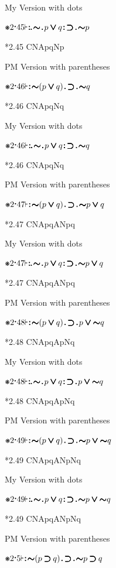 \documentclass[12pt]{article}
\newcommand{\pmthm}{\mathpunct{\text{\scalebox{.5}[1]{$\boldsymbol\vdash$}}}} %
\newcommand{\pmast}{\text{\resizebox{!}{.75\height}{\ding{107}}}} %
\newcommand{\pmcdot}{\text{\raisebox{.05cm}{$\boldsymbol\cdot$}}} %
\newcommand{\pmd}{\hbox{\rule{.3ex}{.3ex}}} %
\newcommand{\pmdd}{\overset{\pmd}{\pmd}} %
\newcommand{\pmdot}{\mathinner{\pmd}}
\newcommand{\pmdott}{\mathinner{\pmdd}}
\newcommand{\pmdottt}{\mathinner{\pmdd\hspace{1pt}\pmd}}
\newcommand{\pmnot}{\mathord{\ooalign{$\boldsymbol{\sim}\mkern.5mu$\hidewidth\cr$\boldsymbol{\sim}$\cr\hidewidth$\mkern.5mu\boldsymbol{\sim}$}}}
\newcommand{\pmor}{\mathbin{\ooalign{$\boldsymbol{\vee}\mkern.5mu$\hidewidth\cr$\boldsymbol{\vee}$\cr\hidewidth$\mkern.5mu\boldsymbol{\vee}$}}}
\newcommand{\pmimp}{\mathbin{\ooalign{$\boldsymbol{\supset}\mkern.5mu$\hidewidth\cr$\boldsymbol{\supset}$\cr\hidewidth$\mkern.5mu\boldsymbol{\supset}$}}} %
\begin{document}
My Version with dots

$\pmast 2 \pmcdot 45 \pmthm \pmdottt \pmnot \pmdot p \pmor q  \pmdott \pmimp \pmdot \pmnot p      $

*2.45 CNApqNp

PM Version with parentheses

$\pmast 2 \pmcdot 46 \pmthm \pmdott \pmnot ( p \pmor q ) \pmdot \pmimp \pmdot \pmnot q      $

*2.46 CNApqNq

My Version with dots

$\pmast 2 \pmcdot 46 \pmthm \pmdottt \pmnot \pmdot p \pmor q  \pmdott \pmimp \pmdot \pmnot q      $

*2.46 CNApqNq

PM Version with parentheses

$\pmast 2 \pmcdot 47 \pmthm \pmdott \pmnot ( p \pmor q ) \pmdot \pmimp \pmdot \pmnot p \pmor q      $

*2.47 CNApqANpq

My Version with dots

$\pmast 2 \pmcdot 47 \pmthm \pmdottt \pmnot \pmdot p \pmor q  \pmdott \pmimp \pmdot \pmnot p \pmor q    $

*2.47 CNApqANpq

PM Version with parentheses

$\pmast 2 \pmcdot 48 \pmthm \pmdott \pmnot ( p \pmor q ) \pmdot \pmimp \pmdot p \pmor \pmnot q      $

*2.48 CNApqApNq

My Version with dots

$\pmast 2 \pmcdot 48 \pmthm \pmdottt \pmnot \pmdot p \pmor q  \pmdott \pmimp \pmdot p \pmor \pmnot q    $

*2.48 CNApqApNq

PM Version with parentheses

$\pmast 2 \pmcdot 49 \pmthm \pmdott \pmnot ( p \pmor q ) \pmdot \pmimp \pmdot \pmnot p \pmor \pmnot q      $

*2.49 CNApqANpNq

My Version with dots

$\pmast 2 \pmcdot 49 \pmthm \pmdottt \pmnot \pmdot p \pmor q  \pmdott \pmimp \pmdot \pmnot p \pmor \pmnot q    $

*2.49 CNApqANpNq


PM Version with parentheses

$\pmast 2 \pmcdot 5 \pmthm \pmdott \pmnot ( p \pmimp q ) \pmdot \pmimp \pmdot \pmnot p \pmimp q      $
\end{document}

